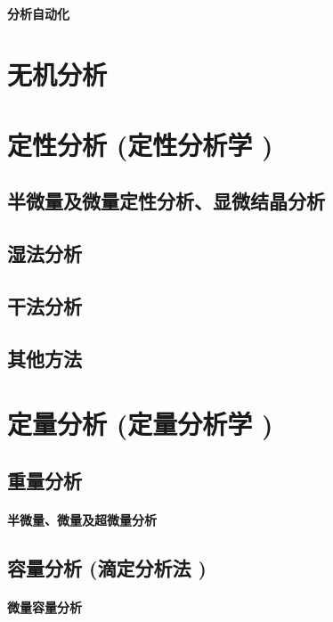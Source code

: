 \documentclass[UTF8]{../03-Chemistry}
\begin{document}
\subsubsection{分析自动化}







\chapter{无机分析}






\chapter{定性分析 (定性分析学 )}
\section{半微量及微量定性分析、显微结晶分析}
\section{湿法分析}
\section{干法分析}
\section{其他方法}






\chapter{定量分析 (定量分析学 )}
\section{重量分析}
    \subsubsection{半微量、微量及超微量分析}
\section{容量分析 (滴定分析法 )}
    \subsubsection{微量容量分析}
\end{document}
